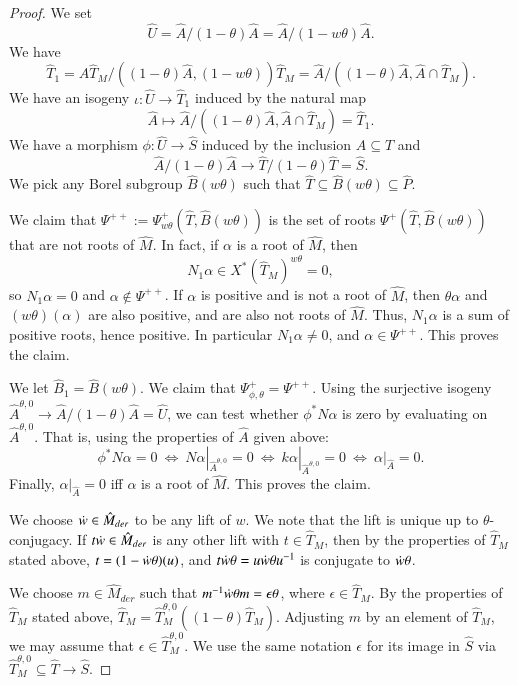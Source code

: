 \begin{proof}
We set 
\[
\hat U= \hat A/(1-\theta)\hat A = \hat A/(1-w\theta)\hat A.
\]
We have 
\[
\hat T_1 = \hat A \hat T_M/((1-\theta)\hat A, (1-w\theta)) \hat T_M
   = \hat A/((1-\theta)\hat A,\hat A\cap \hat T_M).
\]
We have an isogeny $\iota:\hat U\to\hat T_1$ induced by the natural map
\[
\hat A \mapsto  \hat A/((1-\theta)\hat A,\hat A\cap \hat T_M) = \hat T_1.
\]
We have a morphism $\phi:\hat U\to \hat S$ induced by the inclusion $\hat A\subseteq\hat T$
and
\[
\hat A/(1-\theta)\hat A \to \hat T/(1-\theta)\hat T = \hat S.
\]
We pick any Borel subgroup $\hat B(w\theta)$ such that $\hat
T\subseteq \hat B(w\theta) \subseteq \hat P$.

We claim that $\Psi^{++}:=\Psi^+_{w\theta}(\hat T,\hat B(w\theta))$ is the
set of roots $\Psi^+(\hat T,\hat B(w\theta))$ that are not roots of $\hat M$.
In fact, if $\alpha$ is a root of $\hat M$, then
\[
N_1 \alpha\in X^*(\hat T_M)^{w\theta}= 0,
\]
so $N_1\alpha=0$ and $\alpha\not\in\Psi^{++}$.  If $\alpha$ is
positive and is not a root of
$\hat M$, then $\theta\alpha$ and $(w\theta)(\alpha)$ are also positive,
and are also not roots of $\hat M$.  Thus, $N_1\alpha$ is a sum of positive roots,
hence positive.  In particular $N_1\alpha\ne0$, and $\alpha\in \Psi^{++}$.
This proves the claim.

We let $\hat B_1 = \hat B(w\theta)$.  We claim that 
$\Psi_{\phi,\theta}^+ = \Psi^{++}$.
Using the surjective isogeny $\hat A^{\theta,0}\to \hat A/(1-\theta)\hat A= \hat U$, we
can test whether $\phi^* N\alpha$ is zero by evaluating on $\hat A^{\theta,0}$.
That is, using the properties of $\hat A$ given above:
\[
\phi^* N\alpha = 0 \ \Leftrightarrow \ 
N\alpha|_{\hat A^{\theta,0}}=0 \ \Leftrightarrow \ 
k\alpha|_{\hat A^{\theta,0}}=0 \ \Leftrightarrow \ 
\alpha|_{\hat A}=0.
\]
Finally, $\alpha|_{\hat A} = 0$ iff $\alpha$ is a root of $\hat M$.  This proves the claim.

We choose $\dot w\in \hat M_{der}$ to be any lift of $w$.  We note that
the lift is unique up to $\theta$-conjugacy.  If $t\dot w\in \hat
M_{der}$ is any other lift with $t\in \hat T_M$, then by the
properties of $\hat T_M$ stated above, $t = (1-\dot w\theta) (u)$,
and $t\dot w\theta = u\dot w\theta u^{-1}$ is conjugate to $\dot w\theta$.

We choose $m\in \hat M_{der}$ such that $m^{-1} \dot w\theta m = \epsilon
\theta$, where $\epsilon \in \hat T_M$.  By the properties of $\hat
T_M$ stated above, $\hat T_M = \hat T_M^{\theta,0} ((1-\theta)\hat
T_M)$.  Adjusting $m$ by an element of $\hat T_M$, we may assume that
$\epsilon\in \hat T_M^{\theta,0}$.  We use the same notation
$\epsilon$ for its image in $\hat S$ via $\hat T_M^{\theta,0}\subseteq
\hat T \to \hat S$.


\end{proof}
